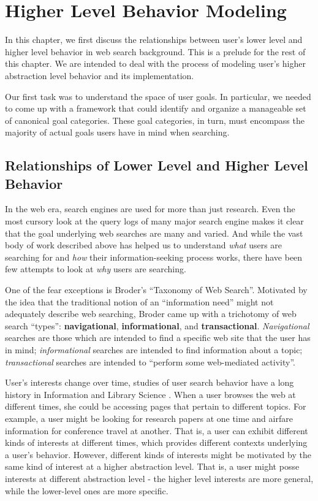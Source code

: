 \chapter{Higher Level Behavior Modeling}

In this chapter, we first discuss the relationships between user's lower level and higher level behavior in web search background. This is a prelude for the rest of this chapter. We are intended to deal with the process of modeling user's higher abstraction level behavior and its implementation. 

Our first task was to understand the space of user goals. In particular, we needed to come up with a framework that could identify and organize a manageable set of canonical goal categories. These goal categories, in turn, must encompass the majority of actual goals users have in mind when searching.

\section{Relationships of Lower Level and Higher Level Behavior}

In the web era, search engines are used for more than just research. Even the most cursory look at the query logs of many major search engine makes it clear that the goal underlying web searches are many and varied. And while the vast body of work described above has helped us to understand {\it what} users are searching for and {\it how} their information-seeking process works, there have been few attempts to look at {\it why} users are searching.

One of the fear exceptions is Broder's ``Taxonomy of Web Search''\cite{Broder2002}. Motivated by the idea that the traditional notion of an ``information need'' might not adequately describe web searching, Broder came up with a trichotomy of web search ``types'': {\bf navigational}, {\bf informational}, and {\bf transactional}. {\it Navigational} searches are those which are intended to find a specific web site that the user has in mind; {\it informational} searches are intended to find information about a topic; {\it transactional} searches are intended to ``perform some web-mediated activity''.

User's interests change over time, studies of user search behavior have a long history in Information and Library Science \cite{Bates1979} \cite{Spink2002}. When a user browses the web at different times, she could be accessing pages that pertain to different topics. For example, a user might be looking for research papers at one time and airfare information for conference travel at another. That is, a user can exhibit different kinds of interests at different times, which provides different contexts underlying a user's behavior. However, different kinds of interests might be motivated by the same kind of interest at a higher abstraction level. That is, a user might posse interests at different abstraction level - the higher level interests are more general, while the lower-level ones are more specific.


